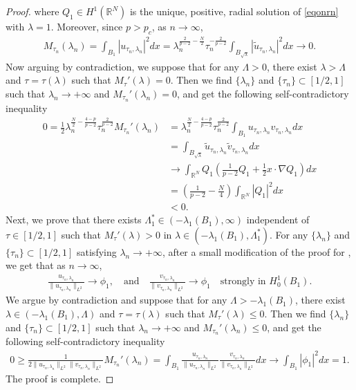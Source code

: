 \documentclass[10pt,a4paper]{article}
\theoremstyle{definition} \theoremstyle{remark}
\numberwithin{equation}{section}
\newcommand{\R}{\mathbb{R}}
\newcommand{\la}{\lambda}
\newcommand{\La}{\Lambda}
\begin{document}
\begin{proof}
    where $Q_1 \in H^1(\R^N)$ is the unique, positive, radial solution of \eqref{eqonrn} with $\la =1$. Moreover, since $p > p_c$, as $n \to \infty$,
    \begin{align*}
    	M_{\tau_n}(\la_n) = \int_{B_1}|u_{\tau_n,\la_n}|^2dx = \la_n^{\frac{2}{p-2}-\frac N2}\tau_n^{-\frac{2}{p-2}}\int_{B_{\sqrt{\la}}}|\tilde{u}_{\tau_n,\la_n}|^2dx \to 0.
    \end{align*}
    Now arguing by contradiction, we suppose that for any $\La > 0$,  there exist $\la > \La$ and $\tau = \tau(\la)$ such that $M_\tau'(\la) = 0$. Then we find $\{\la_n\}$ and $\{\tau_n\} \subset [1/2,1]$ such that $\la_n \to +\infty$ and $M_{\tau_n}'(\la_n) = 0$, and get the following self-contradictory inequality
    \begin{align*}
    	0 = \frac12\la_n^{\frac N2 - \frac{4-p}{p-2}}\tau_n^{\frac{2}{p-2}}M_{\tau_n}'(\la_n) & = \la_n^{\frac N2 - \frac{4-p}{p-2}}\tau_n^{\frac{2}{p-2}}\int_{B_1} u_{\tau_n,\la_n} v_{\tau_n,\la_n} dx \\
    	& = \int_{B_{\sqrt{\la}}} \tilde{u}_{\tau_n,\la_n} \tilde{v}_{\tau_n,\la_n} dx \\
    	& \to \int_{\R^N}Q_1\left( \frac{1}{p-2}Q_1 + \frac12 x \cdot \nabla Q_1\right) dx \\
    	& = \left( \frac{1}{p-2} - \frac N4\right) \int_{\R^N}|Q_1|^2dx \\
    	& < 0.
    \end{align*}
Next, we prove that there exists $\La_1^* \in (-\la_1(B_1),\infty)$ independent of $\tau \in [1/2,1]$ such that $M_\tau'(\la) > 0$ in $\la \in (-\la_1(B_1),\La_1^*)$. For any $\{\la_n\}$ and $\{\tau_n\} \subset [1/2,1]$ satisfying $\la_n \to +\infty$, after a small modification of the proof for \cite[Proposition 12]{FSK}, we get that as $n \to \infty$,
    \begin{align*}
    	\frac{u_{\tau_n,\la_n}}{\|u_{\tau_n,\la_n}\|_{L^2}} \to \phi_1, \quad \text{and} \quad \frac{v_{\tau_n,\la_n}}{\|v_{\tau_n,\la_n}\|_{L^2}} \to \phi_1 \quad \text{strongly in } H_0^1(B_1).
    \end{align*}
    We argue by contradiction and suppose that for any $\La > -\la_1(B_1)$,  there exist $\la \in (-\la_1(B_1), \La)$ and $\tau = \tau(\la)$ such that $M_\tau'(\la) \le 0$. Then we find $\{\la_n\}$ and $\{\tau_n\} \subset [1/2,1]$ such that $\la_n \to +\infty$ and $M_{\tau_n}'(\la_n) \le 0$, and get the following self-contradictory inequality
    \begin{align*}
    0 \ge \frac{1}{2\|u_{\tau_n,\la_n}\|_{L^2}\|v_{\tau_n,\la_n}\|_{L^2}}M_{\tau_n}'(\la_n) = \int_{B_1}\frac{u_{\tau_n,\la_n}}{\|u_{\tau_n,\la_n}\|_{L^2}}\frac{v_{\tau_n,\la_n}}{\|v_{\tau_n,\la_n}\|_{L^2}} dx \to \int_{B_1}|\phi_1|^2dx = 1.
    \end{align*}
    The proof is complete.
\end{proof}
\end{document}
